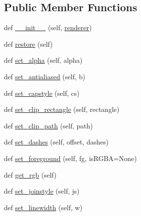 \subsection*{Public Member Functions}
\begin{DoxyCompactItemize}
\item 
def \hyperlink{classmatplotlib_1_1backends_1_1backend__cairo_1_1GraphicsContextCairo_aac96ea6ae53eae0d730a4860ce079894}{\+\_\+\+\_\+init\+\_\+\+\_\+} (self, \hyperlink{classmatplotlib_1_1backends_1_1backend__cairo_1_1GraphicsContextCairo_aa6189db731f7adcedad8848128dd50b4}{renderer})
\item 
def \hyperlink{classmatplotlib_1_1backends_1_1backend__cairo_1_1GraphicsContextCairo_a021441242d915ca5cde097337df95928}{restore} (self)
\item 
def \hyperlink{classmatplotlib_1_1backends_1_1backend__cairo_1_1GraphicsContextCairo_a4eb674af2667b4a308e97aa0885ba3b8}{set\+\_\+alpha} (self, alpha)
\item 
def \hyperlink{classmatplotlib_1_1backends_1_1backend__cairo_1_1GraphicsContextCairo_a05bd1234acd87126ac3795c0cc44766c}{set\+\_\+antialiased} (self, b)
\item 
def \hyperlink{classmatplotlib_1_1backends_1_1backend__cairo_1_1GraphicsContextCairo_ac0c5e2810b18afb722fcb8b73527ae59}{set\+\_\+capstyle} (self, cs)
\item 
def \hyperlink{classmatplotlib_1_1backends_1_1backend__cairo_1_1GraphicsContextCairo_a93e5c7555bcbaf0ae0f8c4bb03003f60}{set\+\_\+clip\+\_\+rectangle} (self, rectangle)
\item 
def \hyperlink{classmatplotlib_1_1backends_1_1backend__cairo_1_1GraphicsContextCairo_a2006c33640d6d00a024ec06a063a1b0c}{set\+\_\+clip\+\_\+path} (self, path)
\item 
def \hyperlink{classmatplotlib_1_1backends_1_1backend__cairo_1_1GraphicsContextCairo_a3baf1db657a9d083031e365906e88fbc}{set\+\_\+dashes} (self, offset, dashes)
\item 
def \hyperlink{classmatplotlib_1_1backends_1_1backend__cairo_1_1GraphicsContextCairo_aaa2a3f1f89fac36566c48b476a37c1b5}{set\+\_\+foreground} (self, fg, is\+R\+G\+BA=None)
\item 
def \hyperlink{classmatplotlib_1_1backends_1_1backend__cairo_1_1GraphicsContextCairo_abb79103b966ee0f1329a0b10a0a91ff9}{get\+\_\+rgb} (self)
\item 
def \hyperlink{classmatplotlib_1_1backends_1_1backend__cairo_1_1GraphicsContextCairo_a819c1521188a1e003822390213122b20}{set\+\_\+joinstyle} (self, js)
\item 
def \hyperlink{classmatplotlib_1_1backends_1_1backend__cairo_1_1GraphicsContextCairo_a98c3f025b9a4a2742fc438aaed5ed4f5}{set\+\_\+linewidth} (self, w)
\end{DoxyCompactItemize}
